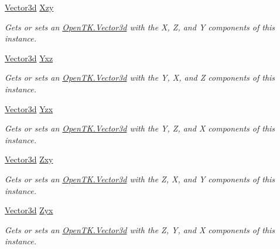 \begin{DoxyCompactItemize}
\hyperlink{struct_open_t_k_1_1_vector3d}{Vector3d} \hyperlink{struct_open_t_k_1_1_vector3d_ab7f5d1a104fcf24bb79cccb06dfbc99d}{Xzy}
\begin{DoxyCompactList}\small\item\em Gets or sets an \hyperlink{struct_open_t_k_1_1_vector3d}{Open\-T\-K.\-Vector3d} with the X, Z, and Y components of this instance. \end{DoxyCompactList}\item 
\hyperlink{struct_open_t_k_1_1_vector3d}{Vector3d} \hyperlink{struct_open_t_k_1_1_vector3d_a2ae98c94c4978c88492ff24351b40941}{Yxz}
\begin{DoxyCompactList}\small\item\em Gets or sets an \hyperlink{struct_open_t_k_1_1_vector3d}{Open\-T\-K.\-Vector3d} with the Y, X, and Z components of this instance. \end{DoxyCompactList}\item 
\hyperlink{struct_open_t_k_1_1_vector3d}{Vector3d} \hyperlink{struct_open_t_k_1_1_vector3d_acbf0f74c431fac06fb539f935a3e82cc}{Yzx}
\begin{DoxyCompactList}\small\item\em Gets or sets an \hyperlink{struct_open_t_k_1_1_vector3d}{Open\-T\-K.\-Vector3d} with the Y, Z, and X components of this instance. \end{DoxyCompactList}\item 
\hyperlink{struct_open_t_k_1_1_vector3d}{Vector3d} \hyperlink{struct_open_t_k_1_1_vector3d_a258be4f58bae23c1e48513647f9f0ad7}{Zxy}
\begin{DoxyCompactList}\small\item\em Gets or sets an \hyperlink{struct_open_t_k_1_1_vector3d}{Open\-T\-K.\-Vector3d} with the Z, X, and Y components of this instance. \end{DoxyCompactList}\item 
\hyperlink{struct_open_t_k_1_1_vector3d}{Vector3d} \hyperlink{struct_open_t_k_1_1_vector3d_a858976422e349beaf8e1de8153d2eece}{Zyx}
\begin{DoxyCompactList}\small\item\em Gets or sets an \hyperlink{struct_open_t_k_1_1_vector3d}{Open\-T\-K.\-Vector3d} with the Z, Y, and X components of this instance. \end{DoxyCompactList}\end{DoxyCompactItemize}


